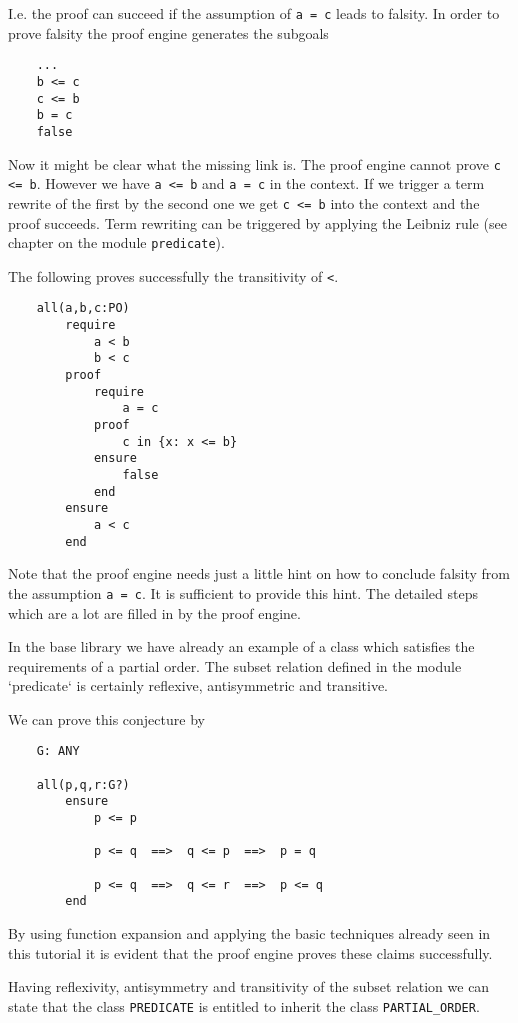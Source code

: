 I.e. the proof can succeed if the assumption of \lstinline!a = c! leads to
falsity. In order to prove falsity the proof engine generates the subgoals
\begin{lstlisting}
    ...
    b <= c
    c <= b
    b = c
    false
\end{lstlisting}
Now it might be clear what the missing link is. The proof engine cannot prove
\lstinline!c <= b!. However we have \lstinline!a <= b! and \lstinline!a = c!
in the context. If we trigger a term rewrite of the first by the second one we
get \lstinline!c <= b! into the context and the proof succeeds. Term rewriting
can be triggered by applying the Leibniz rule (see chapter on the module
\lstinline!predicate!).

The following proves successfully the transitivity of \lstinline!<!.

\begin{lstlisting}
    all(a,b,c:PO)
        require
            a < b
            b < c
        proof
            require
                a = c
            proof
                c in {x: x <= b}
            ensure
                false
            end
        ensure
            a < c
        end
\end{lstlisting}
Note that the proof engine needs just a little hint on how to conclude falsity
from the assumption \lstinline!a = c!. It is sufficient to provide this
hint. The detailed steps which are a lot are filled in by the proof engine.

In the base library we have already an example of a class which satisfies the
requirements of a partial order. The subset relation defined in the module
`predicate` is certainly reflexive, antisymmetric and transitive.

We can prove this conjecture by
\begin{lstlisting}
    G: ANY

    all(p,q,r:G?)
        ensure
            p <= p

            p <= q  ==>  q <= p  ==>  p = q

            p <= q  ==>  q <= r  ==>  p <= q
        end
\end{lstlisting}
By using function expansion and applying the basic techniques already seen in
this tutorial it is evident that the proof engine proves these claims
successfully.

Having reflexivity, antisymmetry and transitivity of the subset relation we
can state that the class \lstinline!PREDICATE! is entitled to inherit the
class \lstinline!PARTIAL_ORDER!.

